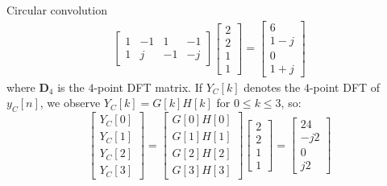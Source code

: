 \documentclass[../../main/main.tex]{subfiles}
\begin{document}
\begin{example}{Circular convolution}{}
\begin{align}
\begin{bmatrix}
                1   &   -1  &   1   &   -1  \\
                1   &   j   &   -1  &   -j
            \end{bmatrix}
            \begin{bmatrix}
                2   \\
                2   \\
                1   \\
                1
            \end{bmatrix}
            =
            \begin{bmatrix}
                6   \\
                1-j \\
                0   \\
                1+j
            \end{bmatrix}
    \end{align}
    where \( \mathbf{D}_{4} \) is the \( 4 \)-point DFT matrix. If \( Y_{C}[k] \) denotes the \( 4 \)-point DFT of \( y_{C}[n] \), we observe \( Y_{C}[k] = G[k]H[k] \) for \( 0 \le k \le 3 \), so:
    \begin{equation}
        \begin{bmatrix}
            Y_{C}[0]    \\
            Y_{C}[1]    \\
            Y_{C}[2]    \\
            Y_{C}[3]
        \end{bmatrix}
        =
        \begin{bmatrix}
            G[0]H[0]    \\
            G[1]H[1]    \\
            G[2]H[2]    \\
            G[3]H[3]
        \end{bmatrix}
        \begin{bmatrix}
            2   \\
            2   \\
            1   \\
            1
        \end{bmatrix}
        =
        \begin{bmatrix}
            24  \\
            -j2 \\
            0   \\
            j2
        \end{bmatrix}
        \label{eq:L12_S52_1}
    \end{equation}

\end{example}
\end{document}

